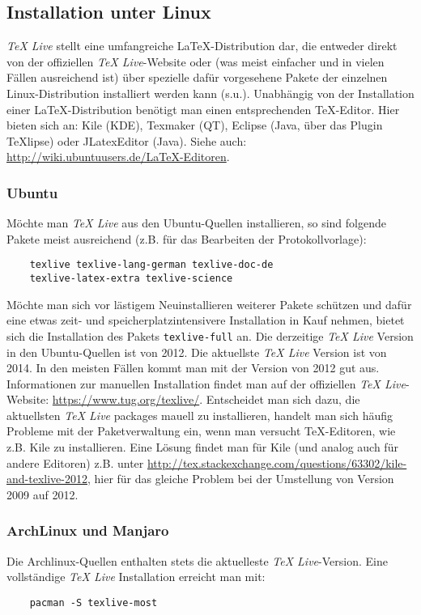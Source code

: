 \subsection{Installation unter Linux}
\textit{TeX Live} stellt eine umfangreiche LaTeX-Distribution dar, die entweder direkt von der offiziellen \textit{TeX Live}-Website oder (was meist einfacher und in vielen Fällen ausreichend ist) über spezielle dafür vorgesehene Pakete der einzelnen Linux-Distribution installiert werden kann (s.u.). Unabhängig von der Installation einer LaTeX-Distribution benötigt man einen entsprechenden TeX-Editor. Hier bieten sich an: Kile (KDE), Texmaker (QT), Eclipse (Java, über das Plugin TeXlipse) oder JLatexEditor (Java). Siehe auch: \url{http://wiki.ubuntuusers.de/LaTeX-Editoren}.

\subsubsection{Ubuntu}
Möchte man \textit{TeX Live} aus den Ubuntu-Quellen installieren, so sind folgende Pakete meist ausreichend (z.B. für das Bearbeiten der Protokollvorlage):
\begin{verbatim}
	texlive texlive-lang-german texlive-doc-de
	texlive-latex-extra texlive-science
\end{verbatim}
Möchte man sich vor lästigem Neuinstallieren weiterer Pakete schützen und dafür eine etwas zeit- und speicherplatzintensivere Installation in Kauf nehmen, bietet sich die Installation des Pakets \verb|texlive-full| an. Die derzeitige \textit{TeX Live} Version in den Ubuntu-Quellen ist von 2012. Die aktuellste \textit{TeX Live} Version ist von 2014. In den meisten Fällen kommt man mit der Version von 2012 gut aus. Informationen zur manuellen Installation findet man auf der offiziellen \textit{TeX Live}-Website: \url{https://www.tug.org/texlive/}. Entscheidet man sich dazu, die aktuellsten \textit{TeX Live} packages mauell zu installieren, handelt man sich häufig Probleme mit der Paketverwaltung ein, wenn man versucht TeX-Editoren, wie z.B. Kile zu installieren. Eine Lösung findet man für Kile (und analog auch für andere Editoren) z.B. unter \url{http://tex.stackexchange.com/questions/63302/kile-and-texlive-2012}, hier für das gleiche Problem bei der Umstellung von Version 2009 auf 2012.

\subsubsection{ArchLinux und Manjaro}
Die Archlinux-Quellen enthalten stets die aktuelleste \textit{TeX Live}-Version. Eine vollständige \textit{TeX Live} Installation erreicht man mit:
\begin{verbatim}
	pacman -S texlive-most
\end{verbatim}

